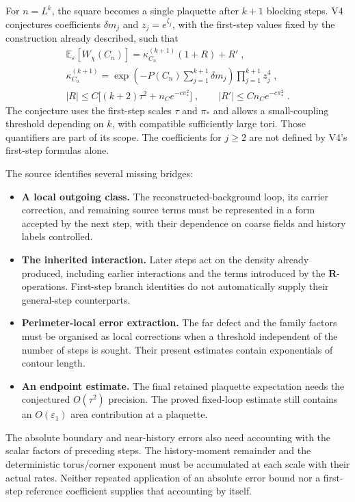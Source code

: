 \documentclass[11pt,a4paper]{article}
\begin{document}
For $n=L^k$, the square becomes a single plaquette after $k+1$ blocking steps. V4 conjectures coefficients $\delta m_j$ and $z_j=e^{\zeta_j}$, with the first-step values fixed by the construction already described, such that
\begin{equation*}
    \begin{gathered}
        \mathbb E_\varepsilon[W_\chi(C_n)] = \kappa^{(k+1)}_{C_n}(1+R)+R'\;,\\
        \kappa^{(k+1)}_{C_n} = \exp \left(-P(C_n)\sum_{j=1}^{k+1}\delta m_j\right) \prod_{j=1}^{k+1}z_j^4 \; , \\
        |R|\leqslant C\bigl[(k+2)\tau^2+n_Ce^{-c\pi_*^2}\bigr] \; , \qquad |R'|\leqslant Cn_Ce^{-c\pi_*^2} \; .
    \end{gathered}
\end{equation*}
The conjecture uses the first-step scales $\tau$ and $\pi_*$ and allows a small-coupling threshold depending on $k$, with compatible sufficiently large tori. Those quantifiers are part of its scope. The coefficients for $j \geqslant 2$ are not defined by V4's first-step formulas alone.

The source identifies several missing bridges:
\begin{itemize}
    \item \textbf{A local outgoing class.} The reconstructed-background loop, its carrier correction, and remaining source terms must be represented in a form accepted by the next step, with their dependence on coarse fields and history labels controlled.
    \item \textbf{The inherited interaction.} Later steps act on the density already produced, including earlier interactions and the terms introduced by the $\mathbf R$-operations. First-step branch identities do not automatically supply their general-step counterparts.
    \item \textbf{Perimeter-local error extraction.} The far defect and the family factors must be organised as local corrections when a threshold independent of the number of steps is sought. Their present estimates contain exponentials of contour length.
    \item \textbf{An endpoint estimate.} The final retained plaquette expectation needs the conjectured $O(\tau^2)$ precision. The proved fixed-loop estimate still contains an $O(\varepsilon_1)$ area contribution at a plaquette.
\end{itemize}

The absolute boundary and near-history errors also need accounting with the scalar factors of preceding steps. The history-moment remainder and the deterministic torus/corner exponent must be accumulated at each scale with their actual rates. Neither repeated application of an absolute error bound nor a first-step reference coefficient supplies that accounting by itself.
\end{document}
